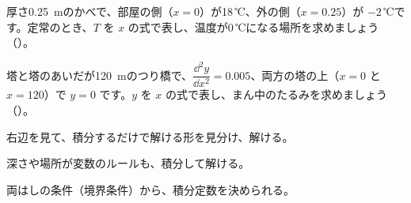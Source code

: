 \bkproblem 厚さ\qty{0.25}{m}のかべで、部屋の側（$x=0$）が18\,℃、外の側（$x=0.25$）が $-2$\,℃です。定常のとき、$T$ を $x$ の式で表し、温度が0\,℃になる場所を求めましょう\mbox{（）}。

\bkproblem 塔と塔のあいだが\qty{120}{m}のつり橋で、$\dfrac{\dd^2y}{\dd x^2}=0.005$、両方の塔の上（$x=0$ と $x=120$）で $y=0$ です。$y$ を $x$ の式で表し、まん中のたるみを求めましょう\mbox{（）}。

\begin{furikaeri}
\begin{checklist}
\item 右辺を見て、積分するだけで解ける形を見分け、解ける。
\item 深さや場所が変数のルールも、積分して解ける。
\item 両はしの条件（境界条件）から、積分定数を決められる。
\end{checklist}
\end{furikaeri}

